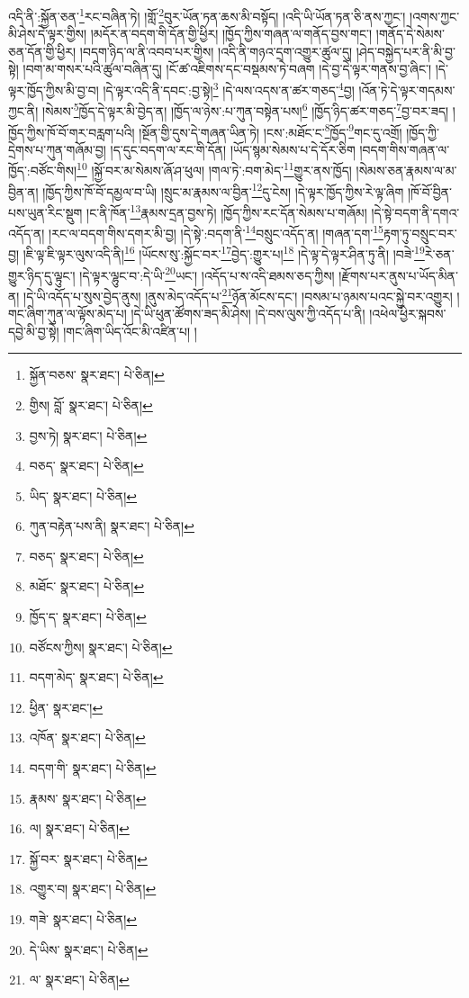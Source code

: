 འདི་ནི་:སྐྱོན་ཅན་\footnote{སྐྱོན་བཅས་  སྣར་ཐང་།  པེ་ཅིན། }རང་བཞིན་ཏེ། །གློ་\footnote{གྱིས། བློ་  སྣར་ཐང་།  པེ་ཅིན། }བུར་ཡོན་ཏན་ཆས་མི་བསྟོད། །འདི་ཡི་ཡོན་ཏན་ཅི་ནས་ཀྱང་། །འགས་ཀྱང་མི་ཤེས་དེ་ལྟར་གྱིས། །མདོར་ན་བདག་གི་དོན་གྱི་ཕྱིར། །ཁྱོད་ཀྱིས་གཞན་ལ་གནོད་བྱས་གང་། །གནོད་དེ་སེམས་ཅན་དོན་གྱི་ཕྱིར། །བདག་ཉིད་ལ་ནི་འབབ་པར་གྱིས། །འདི་ནི་གཉའ་དྲག་འགྱུར་ཚུལ་དུ། །ཤེད་བསྐྱེད་པར་ནི་མི་བྱ་སྟེ། །བག་མ་གསར་པའི་ཚུལ་བཞིན་དུ། །ངོ་ཚ་འཇིགས་དང་བསྡམས་ཏེ་བཞག །དེ་བྱ་དེ་ལྟར་གནས་བྱ་ཞིང་། །དེ་ལྟར་ཁྱོད་ཀྱིས་མི་བྱ་བ། །དེ་ལྟར་འདི་ནི་དབང་:བྱ་སྟེ།\footnote{བྱས་ཏེ།  སྣར་ཐང་།  པེ་ཅིན། } །དེ་ལས་འདས་ན་ཚར་གཅད་\footnote{བཅད་  སྣར་ཐང་།  པེ་ཅིན། }བྱ། །འོན་ཏེ་དེ་ལྟར་གདམས་ཀྱང་ནི། །སེམས་\footnote{ཡིད་  སྣར་ཐང་།  པེ་ཅིན། }ཁྱོད་དེ་ལྟར་མི་བྱེད་ན། །ཁྱོད་ལ་ཉེས་:པ་ཀུན་བསྟེན་པས།\footnote{ཀུན་བརྟེན་པས་ནི།  སྣར་ཐང་།  པེ་ཅིན། } །ཁྱོད་ཉིད་ཚར་གཅད་\footnote{བཅད་  སྣར་ཐང་།  པེ་ཅིན། }བྱ་བར་ཟད། །ཁྱོད་ཀྱིས་ཁོ་བོ་གར་བརླག་པའི། །སྔོན་གྱི་དུས་དེ་གཞན་ཡིན་ཏེ། །ངས་:མཐོང་ང་\footnote{མཐོང་  སྣར་ཐང་།  པེ་ཅིན། }ཁྱོད་\footnote{ཁྱོད་ད་  སྣར་ཐང་།  པེ་ཅིན། }གང་དུ་འགྲོ། །ཁྱོད་ཀྱི་དྲེགས་པ་ཀུན་གཞོམ་བྱ། །ད་དུང་བདག་ལ་རང་གི་དོན། །ཡོད་སྙམ་སེམས་པ་དེ་དོར་ཅིག །བདག་གིས་གཞན་ལ་ཁྱོད་:བཙོང་གིས།\footnote{བཙོངས་ཀྱིས།  སྣར་ཐང་།  པེ་ཅིན། } །སྐྱོ་བར་མ་སེམས་ཞོ་ཤ་ཕུལ། །གལ་ཏེ་:བག་མེད་\footnote{བདག་མེད་  སྣར་ཐང་།  པེ་ཅིན། }གྱུར་ནས་ཁྱོད། །སེམས་ཅན་རྣམས་ལ་མ་བྱིན་ན། །ཁྱོད་ཀྱིས་ཁོ་བོ་དམྱལ་བ་ཡི། །སྲུང་མ་རྣམས་ལ་བྱིན་\footnote{ཕྱིན་  སྣར་ཐང་། }དུ་ངེས། །དེ་ལྟར་ཁྱོད་ཀྱིས་རེ་ལྟ་ཞིག །ཁོ་བོ་བྱིན་པས་ཡུན་རིང་སྡུག །ང་ནི་ཁོན་\footnote{འཁོན་  སྣར་ཐང་།  པེ་ཅིན། }རྣམས་དྲན་བྱས་ཏེ། །ཁྱོད་ཀྱིས་རང་དོན་སེམས་པ་གཞོམ། །དེ་སྟེ་བདག་ནི་དགའ་འདོད་ན། །རང་ལ་བདག་གིས་དགར་མི་བྱ། །དེ་སྟེ་:བདག་ནི་\footnote{བདག་གི་  སྣར་ཐང་།  པེ་ཅིན། }བསྲུང་འདོད་ན། །གཞན་དག་\footnote{རྣམས་  སྣར་ཐང་།  པེ་ཅིན། }རྟག་ཏུ་བསྲུང་བར་བྱ། །ཇི་ལྟ་ཇི་ལྟར་ལུས་འདི་ནི།\footnote{ལ།  སྣར་ཐང་།  པེ་ཅིན། } །ཡོངས་སུ་:སྐྱོང་བར་\footnote{སྐྱོ་བར་  སྣར་ཐང་།  པེ་ཅིན། }བྱེད་:གྱུར་པ།\footnote{འགྱུར་བ།  སྣར་ཐང་།  པེ་ཅིན། } །དེ་ལྟ་དེ་ལྟར་ཤིན་ཏུ་ནི། །བཟེ་\footnote{གཟེ་  སྣར་ཐང་།  པེ་ཅིན། }རེ་ཅན་གྱུར་ཉིད་དུ་ལྟུང་། །དེ་ལྟར་ལྷུང་བ་:དེ་ཡི་\footnote{དེ་ཡིས་  སྣར་ཐང་།  པེ་ཅིན། }ཡང་། །འདོད་པ་ས་འདི་ཐམས་ཅད་ཀྱིས། །རྫོགས་པར་ནུས་པ་ཡོད་མིན་ན། །དེ་ཡི་འདོད་པ་སུས་བྱེད་ནུས། །ནུས་མེད་འདོད་པ་\footnote{ལ་  སྣར་ཐང་།  པེ་ཅིན། }ཉོན་མོངས་དང་། །བསམ་པ་ཉམས་པའང་སྐྱེ་བར་འགྱུར། །གང་ཞིག་ཀུན་ལ་ལྟོས་མེད་པ། །དེ་ཡི་ཕུན་ཚོགས་ཟད་མི་ཤེས། །དེ་བས་ལུས་ཀྱི་འདོད་པ་ནི། །འཕེལ་ཕྱིར་སྐབས་དབྱེ་མི་བྱ་སྟེ། །གང་ཞིག་ཡིད་འོང་མི་འཛིན་པ། །

